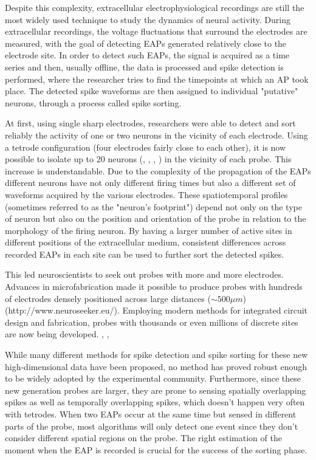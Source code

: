 \documentclass[10pt]{article}
\begin{document}
Despite this complexity, extracellular electrophysiological recordings are still the most widely used technique to study the dynamics of neural activity. During extracellular recordings, the voltage fluctuations that surround the electrodes are measured, with the goal of detecting EAPs generated relatively close to the electrode site. In order to detect such EAPs, the signal is acquired as a time series and then, usually offline, the data is processed and spike detection is performed, where the researcher tries to find the timepoints at which an AP took place. The detected spike waveforms are then assigned to individual "putative" neurons, through a process called spike sorting.


At first, using single sharp electrodes, researchers were able to detect and sort reliably the activity of one or two neurons in the vicinity of each electrode. Using a tetrode configuration (four electrodes fairly close to each other), it is now possible to isolate up to 20 neurons (\cite{mcnaughton1983stereotrode}, \cite{gray1995tetrodes}, \cite{wilson1993dynamics}, \cite{recce1989tetrode}) in the vicinity of each probe. This increase is understandable. Due to the complexity of the propagation of the EAPs different neurons have not only different firing times but also a different set of waveforms acquired by the various electrodes. These spatiotemporal profiles (sometimes referred to as the "neuron's footprint") depend not only on the type of neuron but also on the position and orientation of the probe in relation to the morphology of the firing neuron. By having a larger number of active sites in different positions of the extracellular medium, consistent differences across recorded EAPs in each site can be used to further sort the detected spikes. 

This led neuroscientists to seek out probes with more and more electrodes. Advances in microfabrication made it possible to produce probes with hundreds of electrodes densely positioned across large distances ($\sim 500 \mu m$) (http://www.neuroseeker.eu/). Employing modern methods for integrated circuit design and fabrication, probes with thousands or even millions of discrete sites are now being developed. \cite{dombovari2014vivo}, \cite{ruther2015new}, \cite{shobe2015brain}

While many different methods for spike detection and spike sorting for these new high-dimensional data have been proposed, no method has proved robust enough to be widely adopted by the experimental community. Furthermore, since these new generation probes are larger, they are prone to sensing spatially overlapping spikes as well as temporally overlapping spikes, which doesn't happen very often with tetrodes. When two EAPs occur at the same time but sensed in different parts of the probe, most algorithms will only detect one event since they don't consider different spatial regions on the probe. The right estimation of the moment when the EAP is recorded is crucial for the success of the sorting phase. 
\end{document}
